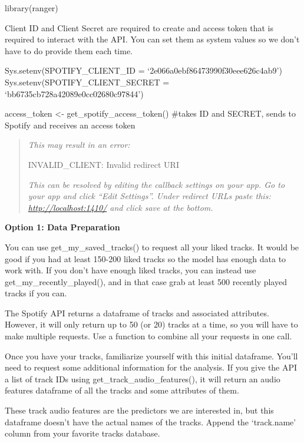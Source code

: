 \documentclass[
]{article}
\newenvironment{Shaded}{\begin{snugshade}}{\end{snugshade}}
\newcommand{\FunctionTok}[1]{\textcolor[rgb]{0.00,0.00,0.00}{#1}}
\newcommand{\NormalTok}[1]{#1}
\begin{document}
\begin{Shaded}
\begin{Highlighting}[]
\FunctionTok{library}\NormalTok{(ranger)}
\end{Highlighting}
\end{Shaded}

Client ID and Client Secret are required to create and access token that
is required to interact with the API. You can set them as system values
so we don't have to do provide them each time.

Sys.setenv(SPOTIFY\_CLIENT\_ID = `2e066a0ebf86473990f30eee626c4ab9')
Sys.setenv(SPOTIFY\_CLIENT\_SECRET = `bb6735cb728a42089e0cc02680c97844')

access\_token \textless- get\_spotify\_access\_token() \#takes ID and
SECRET, sends to Spotify and receives an access token

\begin{quote}
\emph{This may result in an error:}

INVALID\_CLIENT: Invalid redirect URI

\emph{This can be resolved by editing the callback settings on your app.
Go to your app and click ``Edit Settings''. Under redirect URLs paste
this: \url{http://localhost:1410/} and click save at the bottom.}
\end{quote}

\textbf{Option 1: Data Preparation}

You can use get\_my\_saved\_tracks() to request all your liked tracks.
It would be good if you had at least 150-200 liked tracks so the model
has enough data to work with. If you don't have enough liked tracks, you
can instead use get\_my\_recently\_played(), and in that case grab at
least 500 recently played tracks if you can.

The Spotify API returns a dataframe of tracks and associated attributes.
However, it will only return up to 50 (or 20) tracks at a time, so you
will have to make multiple requests. Use a function to combine all your
requests in one call.

Once you have your tracks, familiarize yourself with this initial
dataframe. You'll need to request some additional information for the
analysis. If you give the API a list of track IDs using
get\_track\_audio\_features(), it will return an audio features
dataframe of all the tracks and some attributes of them.

These track audio features are the predictors we are interested in, but
this dataframe doesn't have the actual names of the tracks. Append the
`track.name' column from your favorite tracks database.
\end{document}
